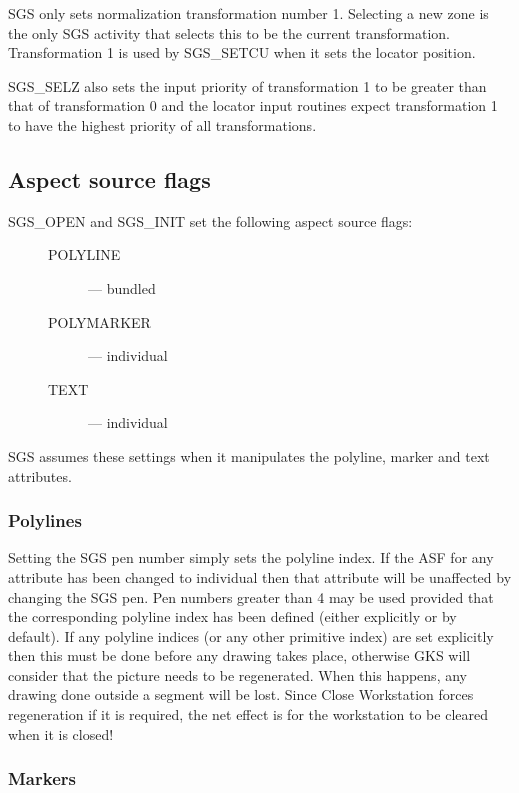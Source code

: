 \documentclass[11pt]{article}
\newcommand{\htmlref}[2]{#1}
\begin{document}
SGS only sets normalization transformation number 1.
Selecting a new zone is the only SGS activity that selects this to be the
current transformation.
Transformation 1 is used by
\htmlref{SGS\_SETCU}{SGS_SETCU} when it sets the locator position.

\htmlref{SGS\_SELZ}{SGS_SELZ}
 also sets the input priority of transformation 1 to be greater than
that of transformation 0 and the locator input routines expect transformation
1 to have the highest priority of all transformations.

\subsection* {Aspect source flags}

\htmlref{SGS\_OPEN}{SGS_OPEN} and \htmlref{SGS\_INIT}{SGS_INIT}
set the following aspect source flags:
\begin{description}
\item[\mbox{}]\mbox{}
\begin{description}
\item [POLYLINE] --- bundled
\item [POLYMARKER] --- individual
\item [TEXT] --- individual
\end{description}
\end{description}
SGS assumes these settings when it manipulates the polyline, marker and text
attributes.

\subsubsection* {Polylines}

Setting the SGS pen number simply sets the polyline index.
If the ASF for any attribute has been changed to individual then that attribute
will be unaffected by changing the SGS pen.
Pen numbers greater than 4 may be used provided that the corresponding polyline
index has been defined (either explicitly or by default).
If any polyline indices (or any other primitive index) are set explicitly then
this must be done before any drawing takes place, otherwise GKS will consider
that the picture needs to be regenerated.
When this happens, any drawing done outside a segment will be lost.
Since Close Workstation forces regeneration if it is required, the net effect is
for the workstation to be cleared when it is closed!

\subsubsection* {Markers}
\end{document}

